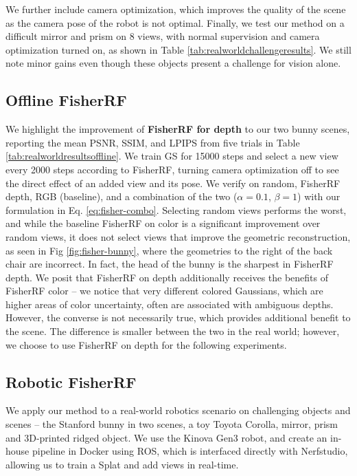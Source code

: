 \documentclass[letterpaper, 10 pt, conference]{ieeeconf}  %
\begin{document}
We further include camera optimization, which improves the quality of the scene as the camera pose of the robot is not optimal.
Finally, we test our method on a difficult mirror and prism on 8 views, with normal supervision and camera optimization turned on, as shown in Table \ref{tab:realworldchallengeresults}. We still note minor gains even though these objects present a challenge for vision alone.


\subsection{Offline FisherRF}
We highlight the improvement of \textbf{FisherRF for depth} to our two bunny scenes, reporting the mean PSNR, SSIM, and LPIPS from five trials in Table \ref{tab:realworldresultsoffline}. We train GS for 15000 steps and select a new view every 2000 steps according to FisherRF, turning camera optimization off to see the direct effect of an added view and its pose. We verify on random, FisherRF depth, RGB (baseline), and a combination of the two ($\alpha = 0.1$, $\beta = 1$) with our formulation in Eq. \ref{eq:fisher-combo}. Selecting random views performs the worst, and while the baseline FisherRF on color is a significant improvement over random views, it does not select views that improve the geometric reconstruction, as seen in Fig \ref{fig:fisher-bunny}, where the geometries to the right of the back chair are incorrect. In fact, the head of the bunny is the sharpest in FisherRF depth. We posit that FisherRF on depth additionally receives the benefits of FisherRF color -- we notice that very different colored Gaussians, which are higher areas of color uncertainty, often are associated with ambiguous depths. However, the converse is not necessarily true, which provides additional benefit to the scene. The difference is smaller between the two in the real world; however, we choose to use FisherRF on depth for the following experiments.




\subsection{Robotic FisherRF}

We apply our method to a real-world robotics scenario on challenging objects and scenes -- the Stanford bunny in two scenes, a toy Toyota Corolla, mirror, prism and 3D-printed ridged object. We use the Kinova Gen3 robot, and create an in-house pipeline in Docker using ROS, which is interfaced directly with Nerfstudio, allowing us to train a Splat and add views in real-time.
\end{document}
